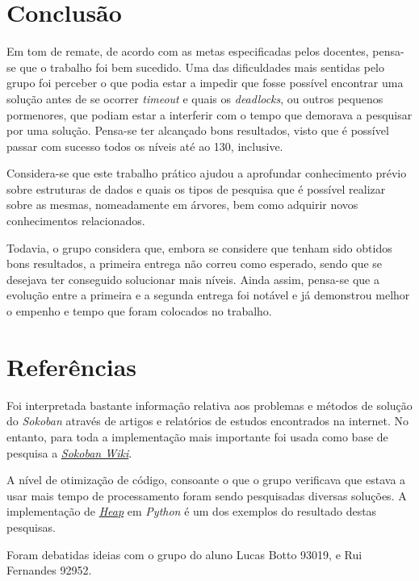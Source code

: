 \documentclass[10pt,portuguese]{article}
\begin{document}
\section{Conclusão}
\par Em tom de remate, de acordo com as metas especificadas pelos docentes, pensa-se que o trabalho foi bem sucedido. Uma das dificuldades mais sentidas pelo grupo foi perceber o que podia estar a impedir que fosse possível encontrar uma solução antes de se ocorrer \textit{timeout} e quais os \textit{deadlocks}, ou outros pequenos pormenores, que podiam estar a interferir com o tempo que demorava a pesquisar por uma solução. Pensa-se ter alcançado bons resultados, visto que é possível passar com sucesso todos os níveis até ao 130, inclusive.
\par Considera-se que este trabalho prático ajudou a aprofundar  conhecimento prévio sobre estruturas de dados e quais os tipos de pesquisa que é possível realizar sobre as mesmas, nomeadamente em árvores, bem como adquirir novos conhecimentos relacionados.
\par Todavia, o grupo considera que, embora se considere que tenham sido obtidos bons resultados, a primeira entrega não correu como esperado, sendo que se desejava ter conseguido solucionar mais níveis. Ainda assim, pensa-se que a evolução entre a primeira e a segunda entrega foi notável e já demonstrou melhor o empenho e tempo que foram colocados no trabalho. 

\section{Referências}

\par Foi interpretada bastante informação relativa aos problemas e métodos de solução do \textit{Sokoban} através de artigos e relatórios de estudos encontrados na internet. No entanto, para toda a implementação mais importante foi usada como base de pesquisa a \href{http://sokobano.de/wiki/index.php?title=Solver}{\textit{Sokoban Wiki}}.

\par A nível de otimização de código, consoante o que o grupo verificava que estava a usar mais tempo de processamento foram sendo pesquisadas diversas soluções. A implementação de \href{https://docs.python.org/3/library/heapq.html}{\textit{Heap}} em \textit{Python} é um dos exemplos do resultado destas pesquisas.

\par Foram debatidas ideias com o grupo do aluno Lucas Botto 93019, e Rui Fernandes 92952. 
\end{document}
